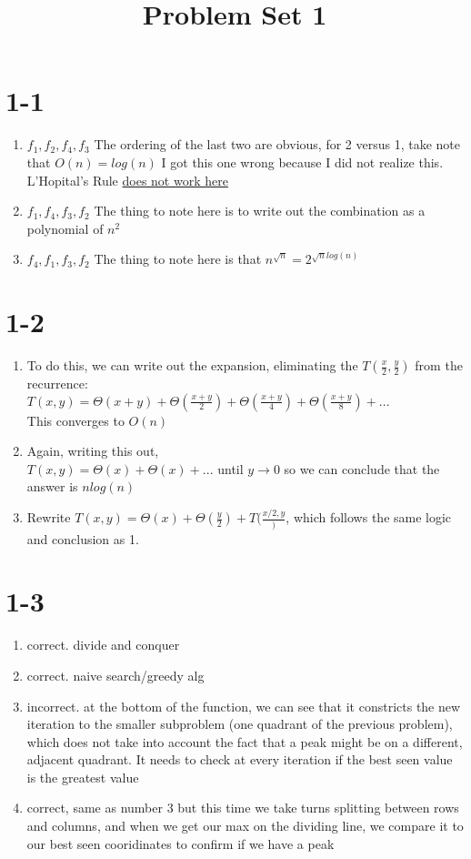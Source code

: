 \documentclass{article}
\title{Problem Set 1}
\begin{document}
    \section{1-1}
        \begin{enumerate}
            \item $f_1, f_2, f_4, f_3$ The ordering of the last two are obvious, for 2 versus 1, take note that $O(n) = log(n)$ I got this one wrong because I did not realize this. L'Hopital's Rule \href{https://www.mathwarehouse.com/calculus/derivatives/when-Lhopitals-rule-fail.php}{does not work here}
            \item $f_1, f_4, f_3, f_2$ The thing to note here is to write out the combination as a polynomial of $n^2$
            \item $f_4, f_1, f_3, f_2$ The thing to note here is that $n^{\sqrt{n}} = 2^{\sqrt{n}log(n)}$
        \end{enumerate}

    \section{1-2}
        \begin{enumerate}
            \item To do this, we can write out the expansion, eliminating the $T(\frac{x}{2}, \frac{y}{2})$ from the recurrence:\\
            $T(x, y) = \Theta(x+y) + \Theta(\frac{x+y}{2}) + \Theta(\frac{x+y}{4}) + \Theta(\frac{x+y}{8}) + ...$\\
            This converges to $O(n)$
            \item Again, writing this out,\\ $T(x, y) = \Theta(x) + \Theta(x) + ... $ until $y \rightarrow 0$ so we can conclude that the answer is $nlog(n)$
            \item Rewrite $T(x, y) = \Theta(x) + \Theta(\frac{y}{2}) + T(\frac{x/2, y})$, which follows the same logic and conclusion as 1.
        \end{enumerate}
    \section{1-3}
        \begin{enumerate}
            \item correct. divide and conquer
            \item correct. naive search/greedy alg
            \item incorrect. at the bottom of the function, we can see that it constricts the new iteration to the smaller subproblem (one quadrant of the previous problem), which does not take into account the fact that a peak might be on a different, adjacent quadrant. It needs to check at every iteration if the best seen value is the greatest value
            \item correct, same as number 3 but this time we take turns splitting between rows and columns, and when we get our max on the dividing line, we compare it to our best seen cooridinates to confirm if we have a peak
        \end{enumerate}
\end{document}
